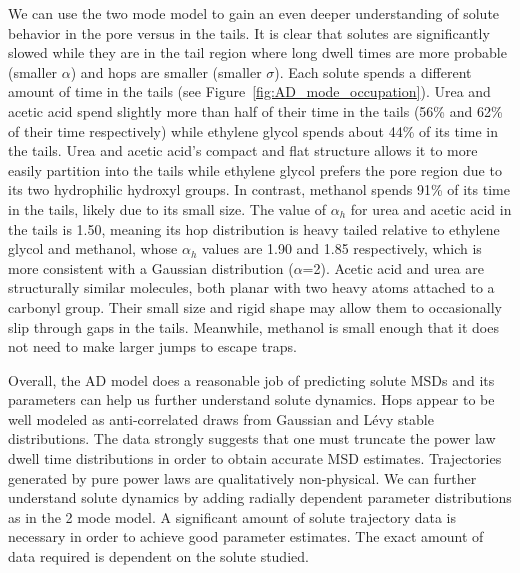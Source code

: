 \documentclass[aps,pre,preprint,groupedaddress]{revtex4-2}
\begin{document}
  We can use the two mode model to gain an even deeper understanding of solute behavior
  in the pore versus in the tails. It is clear that solutes are significantly slowed 
  while they are in the tail region where long dwell times are more probable
  (smaller $\alpha$) and hops are smaller (smaller $\sigma$). Each solute spends 
  a different amount of time in the tails (see Figure~\ref{fig:AD_mode_occupation}). 
  Urea and acetic acid spend slightly more than half of their time in the tails 
  (56\% and 62\% of their time respectively) while ethylene glycol spends about 
  44\% of its time in the tails. Urea and acetic acid's compact and flat structure 
  allows it to more easily partition into the tails while ethylene glycol prefers
  the pore region due to its two hydrophilic hydroxyl groups. In contrast, methanol 
  spends 91\% of its time in the tails, likely due to its small size.  
  The value of $\alpha_h$ for urea and acetic acid in the tails is 1.50, meaning its hop distribution
  is heavy tailed relative to ethylene glycol and methanol, whose $\alpha_h$ values are
  1.90 and 1.85 respectively, which is more consistent with a Gaussian distribution ($\alpha$=2).
  Acetic acid and urea are structurally similar molecules, both planar with two heavy atoms attached to a 
  carbonyl group. Their small size and rigid shape may allow them to occasionally slip
  through gaps in the tails. Meanwhile, methanol is small enough that it does not need
  to make larger jumps to escape traps.
  
  Overall, the AD model does a reasonable job of predicting solute MSDs and its 
  parameters can help us further understand solute dynamics. Hops appear to be well
  modeled as anti-correlated draws from 
  Gaussian and L\'evy stable distributions. 
  The data strongly suggests that one must truncate the power law dwell time 
  distributions in order to obtain accurate MSD estimates. Trajectories generated 
  by pure power laws are qualitatively non-physical. We can further understand
  solute dynamics by adding radially dependent parameter distributions as in the 
  2 mode model. A significant amount of solute trajectory data is necessary 
  in order to achieve good parameter estimates. 
  The exact amount of data required is dependent on the solute studied. 
\end{document}
